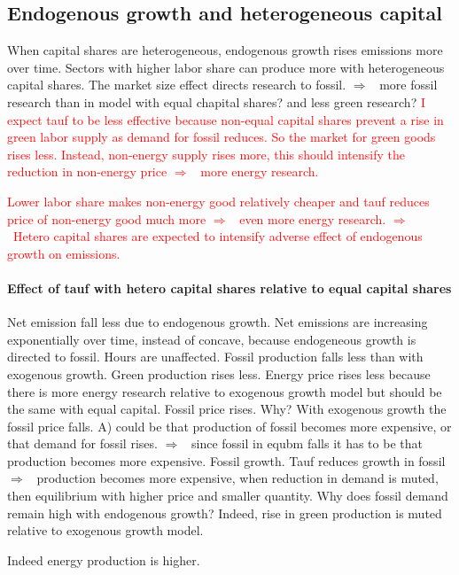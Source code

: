 \documentclass[12pt]{article}
\newcommand{\ar}{$\Rightarrow$ \ }
\newcommand{\tr}[1]{\textcolor{red}{#1}}
\begin{document}
\subsection{Endogenous growth and heterogeneous capital}
When capital shares are heterogeneous, endogenous growth rises emissions more over time. Sectors with higher labor share can produce more with heterogeneous capital shares. The market size effect directs research to fossil. \ar more fossil research than in model with equal chapital shares? and less green research?  
\tr{I expect tauf to be less effective because non-equal capital shares prevent a rise in green labor supply as demand for fossil reduces. So the market for green goods rises less. Instead, non-energy supply rises more, this should intensify the reduction in non-energy price \ar more energy research.}

\tr{
Lower labor share makes non-energy good relatively cheaper and tauf reduces price of non-energy good much more \ar even more energy research. 
\ar Hetero capital shares are expected to intensify adverse effect of endogenous growth on emissions. 
}
\paragraph{Effect of tauf with hetero capital shares relative to equal capital shares}

Net emission fall less due to endogenous growth. Net emissions are increasing exponentially over time, instead of concave, because endogeneous growth is directed to fossil. Hours are unaffected. Fossil production falls less than with exogenous growth. Green production rises less. Energy price rises less because there is more energy research relative to exogenous growth model but should be the same with equal capital. Fossil price rises. Why? With exogenous growth the fossil price falls. A) could be that production of fossil becomes more expensive, or that demand for fossil rises. \ar since fossil in equbm falls it has to be that production becomes more expensive. 
Fossil growth. Tauf reduces growth in fossil \ar production becomes more expensive, when reduction in demand is muted, then equilibrium with higher price and smaller quantity. Why does fossil demand remain high with endogenous growth? Indeed, rise in green production is muted relative to exogenous growth model. 

Indeed energy production is higher. 
\end{document}
